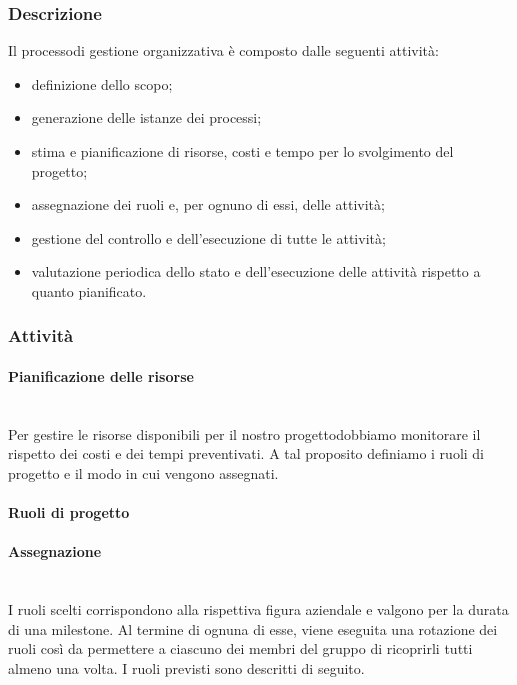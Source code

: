 		\subsubsection{Descrizione}
			Il processo\glosp di gestione organizzativa è composto dalle seguenti attività:
			\begin{itemize}
				\item definizione dello scopo;
				\item generazione delle istanze dei processi\glo;
				\item stima e pianificazione di risorse, costi e tempo per lo svolgimento del progetto\glo;
				\item assegnazione dei ruoli e, per ognuno di essi, delle attività;
				\item gestione del controllo e dell'esecuzione di tutte le attività;
				\item valutazione periodica dello stato e dell'esecuzione delle attività rispetto a quanto pianificato.
			\end{itemize}			
		\subsubsection{Attività}
		\paragraph{Pianificazione delle risorse}\mbox{}\\ [1mm]
		Per gestire le risorse disponibili per il nostro progetto\glosp dobbiamo monitorare il rispetto dei costi e dei tempi preventivati. A tal proposito definiamo i ruoli di progetto e il modo in cui vengono assegnati.
		\paragraph{Ruoli di progetto}
			\paragraph*{Assegnazione}\mbox{}\\ [1mm]
				I ruoli scelti corrispondono alla rispettiva figura aziendale e valgono per la durata di una milestone. Al termine di ognuna di esse, viene eseguita una rotazione dei ruoli così da permettere a ciascuno dei membri del gruppo di ricoprirli tutti almeno una volta.
				I ruoli previsti sono descritti di seguito.
